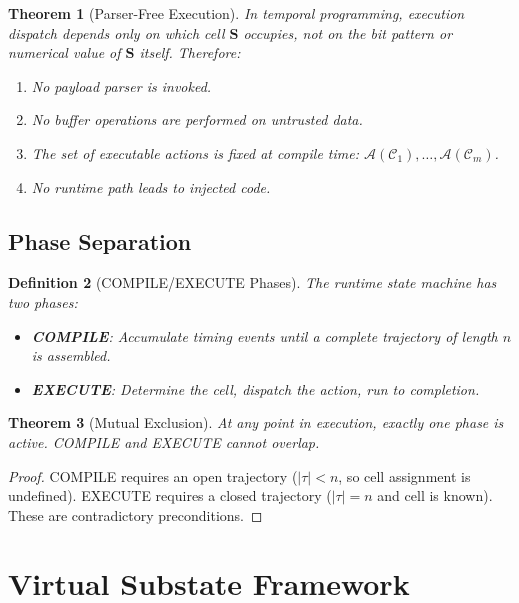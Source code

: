 \documentclass[twocolumn,11pt,a4paper]{article}
\newtheorem{theorem}{Theorem}[section]
\newtheorem{definition}[theorem]{Definition}
\newcommand{\Stuple}{\mathbf{S}}
\newcommand{\calC}{\mathcal{C}}
\begin{document}
\begin{theorem}[Parser-Free Execution]
In temporal programming, execution dispatch depends only on which cell $\Stuple$ occupies, not on the bit pattern or numerical value of $\Stuple$ itself. Therefore:
\begin{enumerate}[nosep,label=(\roman*)]
  \item No payload parser is invoked.
  \item No buffer operations are performed on untrusted data.
  \item The set of executable actions is fixed at compile time: $\mathcal{A}(\calC_1), \ldots, \mathcal{A}(\calC_m)$.
  \item No runtime path leads to injected code.
\end{enumerate}
\end{theorem}

\subsection{Phase Separation}

\begin{definition}[COMPILE/EXECUTE Phases]
The runtime state machine has two phases:
\begin{itemize}[nosep,leftmargin=1em]
  \item \textbf{COMPILE}: Accumulate timing events until a complete trajectory of length $n$ is assembled.
  \item \textbf{EXECUTE}: Determine the cell, dispatch the action, run to completion.
\end{itemize}
\end{definition}

\begin{theorem}[Mutual Exclusion]
At any point in execution, exactly one phase is active. COMPILE and EXECUTE cannot overlap.
\end{theorem}

\begin{proof}
COMPILE requires an open trajectory ($|\tau| < n$, so cell assignment is undefined). EXECUTE requires a closed trajectory ($|\tau| = n$ and cell is known). These are contradictory preconditions.
\end{proof}

\section{Virtual Substate Framework}
\label{sec:virtual}
\end{document}
